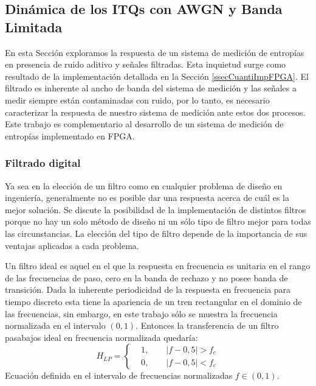 \subsection{Dinámica de los ITQs con AWGN y Banda Limitada}
\label{ssec:TDdS}
	
En esta Sección exploramos la respuesta de un sistema de medición de entropías en presencia de ruido aditivo y señales filtradas.
Esta inquietud surge como resultado de la implementación detallada en la Sección \ref{ssecCuantiImpFPGA}.
El filtrado es inherente al ancho de banda del sistema de medición y las señales a medir siempre están contaminadas con ruido, por lo tanto, es necesario caracterizar la respuesta de nuestro sistema de medición ante estos dos procesos.
Este trabajo es complementario al desarrollo de un sistema de medición de entropías implementado en FPGA.

\subsubsection{Filtrado digital}
\label{sec:filtrado}

Ya sea en la elección de un filtro como en cualquier problema de diseño en ingeniería, generalmente no es posible dar una respuesta acerca de cuál es la mejor solución. Se discute la posibilidad de la implementación de distintos filtros porque no hay un solo método de diseño ni un sólo tipo de filtro mejor para todas las circunstancias. La elección del tipo de filtro depende de la importancia de sus ventajas aplicadas a cada problema.

Un filtro ideal es aquel en el que la respuesta en frecuencia es unitaria en el rango de las frecuencias de paso, cero en la banda de rechazo y no posee banda de transición. Dada la inherente periodicidad de la respuesta en frecuencia para tiempo discreto esta tiene la apariencia de un tren rectangular en el dominio de las frecuencias, sin embargo, en este trabajo sólo se muestra la frecuencia normalizada en el intervalo $(0,1)$. Entonces la transferencia de un filtro pasabajos ideal en frecuencia normalizada quedaría:
\begin{equation}
H_{LP}=
\left\{ 
\begin{aligned}
&1,\qquad|f-0,5|>f_c\\
&0,\qquad|f-0,5|<f_c
\end{aligned}
\right.
\end{equation}
Ecuación definida en el intervalo de frecuencias normalizadas $f\in\left(0,1\right)$.

